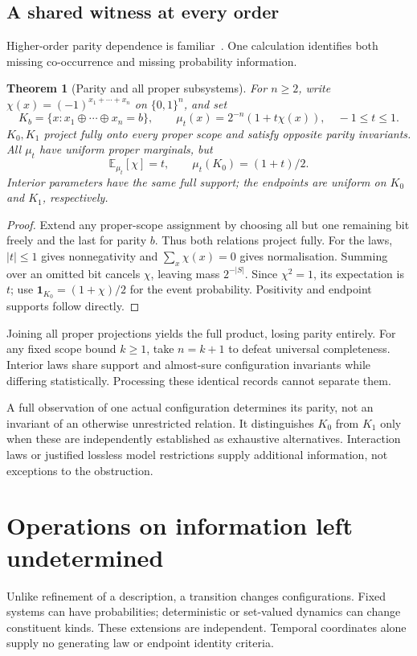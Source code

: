 \documentclass[11pt]{article}
\newtheorem{theorem}{Theorem}
\newcommand{\E}{\mathbb E}
\newcommand{\ind}{\mathbf 1}
\begin{document}
\subsection{A shared witness at every order}\label{sec:parity}
Higher-order parity dependence is familiar~\cite{schneidman}. One calculation identifies both missing co-occurrence and missing probability information.
\begin{theorem}[Parity and all proper subsystems]\label{thm:parity}
For $n\geq2$, write $\chi(x)=(-1)^{x_1+\cdots+x_n}$ on $\{0,1\}^n$, and set
\begin{equation}\label{eq:paritylaws}
K_b=\{x:x_1\oplus\cdots\oplus x_n=b\},\qquad
\mu_t(x)=2^{-n}(1+t\chi(x)),\quad -1\leq t\leq1.
\end{equation}
$K_0,K_1$ project fully onto every proper scope and satisfy opposite parity invariants. All $\mu_t$ have uniform proper marginals, but
\begin{equation}\label{eq:paritymoments}
\E_{\mu_t}[\chi]=t,\qquad \mu_t(K_0)=(1+t)/2.
\end{equation}
Interior parameters have the same full support; the endpoints are uniform on $K_0$ and $K_1$, respectively.
\end{theorem}
\begin{proof}
Extend any proper-scope assignment by choosing all but one remaining bit freely and the last for parity $b$. Thus both relations project fully. For the laws, $|t|\leq1$ gives nonnegativity and $\sum_x\chi(x)=0$ gives normalisation. Summing over an omitted bit cancels $\chi$, leaving mass $2^{-|S|}$. Since $\chi^2=1$, its expectation is $t$; use $\ind_{K_0}=(1+\chi)/2$ for the event probability. Positivity and endpoint supports follow directly.
\end{proof}
Joining all proper projections yields the full product, losing parity entirely. For any fixed scope bound $k\geq1$, take $n=k+1$ to defeat universal completeness. Interior laws share support and almost-sure configuration invariants while differing statistically. Processing these identical records cannot separate them.

A full observation of one actual configuration determines its parity, not an invariant of an otherwise unrestricted relation. It distinguishes $K_0$ from $K_1$ only when these are independently established as exhaustive alternatives. Interaction laws or justified lossless model restrictions supply additional information, not exceptions to the obstruction.

\section{Operations on information left undetermined}\label{sec:transformation}
Unlike refinement of a description, a transition changes configurations. Fixed systems can have probabilities; deterministic or set-valued dynamics can change constituent kinds. These extensions are independent. Temporal coordinates alone supply no generating law or endpoint identity criteria.
\end{document}

